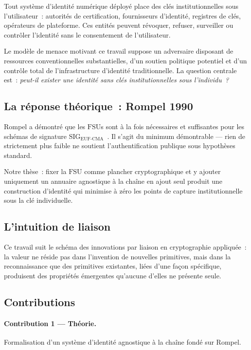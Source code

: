 \documentclass[11pt,a4paper]{article}
\theoremstyle{definition}
\newcommand{\OWF}{\mathrm{FSU}}
\newcommand{\SIG}{\mathrm{SIG}}
\newcommand{\EUFCMA}{\mathrm{EUF\text{-}CMA}}
\begin{document}
Tout système d'identité numérique déployé place des clés
institutionnelles sous l'utilisateur~: autorités de certification,
fournisseurs d'identité, registres de clés, opérateurs de plateforme.
Ces entités peuvent révoquer, refuser, surveiller ou contrôler
l'identité sans le consentement de l'utilisateur.

Le modèle de menace motivant ce travail suppose un adversaire
disposant de ressources conventionnelles substantielles, d'un soutien
politique potentiel et d'un contrôle total de l'infrastructure
d'identité traditionnelle. La question centrale est~:
\emph{peut-il exister une identité sans clés institutionnelles sous
l'individu~?}

\subsection{La réponse théorique~: Rompel 1990}

Rompel a démontré que les $\OWF$s sont à la fois nécessaires et
suffisantes pour les schémas de signature
$\SIG_{\EUFCMA}$~\cite{Rompel90}. Il s'agit du minimum démontrable
--- rien de strictement plus faible ne soutient l'authentification
publique sous hypothèses standard.

Notre thèse~: fixer la $\OWF$ comme plancher cryptographique et y
ajouter uniquement un annuaire agnostique à la chaîne en ajout seul
produit une construction d'identité qui minimise à zéro les points
de capture institutionnelle sous la clé individuelle.

\subsection{L'intuition de liaison}

Ce travail suit le schéma des innovations par liaison en cryptographie
appliquée~: la valeur ne réside pas dans l'invention de nouvelles
primitives, mais dans la reconnaissance que des primitives existantes,
liées d'une façon spécifique, produisent des propriétés émergentes
qu'aucune d'elles ne présente seule.

\subsection{Contributions}

\paragraph{Contribution 1 --- Théorie.}
Formalisation d'un système d'identité agnostique à la chaîne fondé
sur Rompel.
\end{document}
